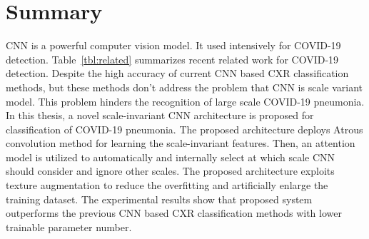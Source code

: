 

\section{Summary}
CNN is a powerful computer vision model. It used intensively for COVID-19 detection. Table~\ref{tbl:related} summarizes recent related work for COVID-19 detection. Despite the high accuracy of current CNN based CXR classification methods, but these methods don't address the problem that CNN is scale variant model. This problem hinders the recognition of large scale COVID-19 pneumonia. In this thesis, a novel scale-invariant CNN architecture is proposed for classification of COVID-19 pneumonia. The proposed architecture deploys Atrous convolution method for learning the scale-invariant features. Then, an attention model is utilized to automatically and internally select at which scale  CNN should consider and ignore other scales. The proposed architecture exploits texture augmentation to reduce the overfitting and artificially enlarge the training dataset. The experimental results show that proposed system outperforms  the previous  CNN based CXR classification methods  with lower trainable parameter number.

